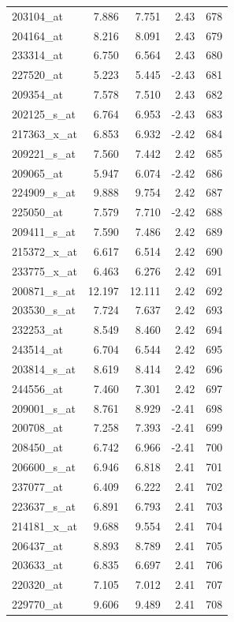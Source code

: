 \begin{footnotesize}
\begin{longtable}{lrrrr}
203104\_at & 7.886 & 7.751 & 2.43 & 678 \\
204164\_at & 8.216 & 8.091 & 2.43 & 679 \\
233314\_at & 6.750 & 6.564 & 2.43 & 680 \\
227520\_at & 5.223 & 5.445 & -2.43 & 681 \\
209354\_at & 7.578 & 7.510 & 2.43 & 682 \\
202125\_s\_at & 6.764 & 6.953 & -2.43 & 683 \\
217363\_x\_at & 6.853 & 6.932 & -2.42 & 684 \\
209221\_s\_at & 7.560 & 7.442 & 2.42 & 685 \\
209065\_at & 5.947 & 6.074 & -2.42 & 686 \\
224909\_s\_at & 9.888 & 9.754 & 2.42 & 687 \\
225050\_at & 7.579 & 7.710 & -2.42 & 688 \\
209411\_s\_at & 7.590 & 7.486 & 2.42 & 689 \\
215372\_x\_at & 6.617 & 6.514 & 2.42 & 690 \\
233775\_x\_at & 6.463 & 6.276 & 2.42 & 691 \\
200871\_s\_at & 12.197 & 12.111 & 2.42 & 692 \\
203530\_s\_at & 7.724 & 7.637 & 2.42 & 693 \\
232253\_at & 8.549 & 8.460 & 2.42 & 694 \\
243514\_at & 6.704 & 6.544 & 2.42 & 695 \\
203814\_s\_at & 8.619 & 8.414 & 2.42 & 696 \\
244556\_at & 7.460 & 7.301 & 2.42 & 697 \\
209001\_s\_at & 8.761 & 8.929 & -2.41 & 698 \\
200708\_at & 7.258 & 7.393 & -2.41 & 699 \\
208450\_at & 6.742 & 6.966 & -2.41 & 700 \\
206600\_s\_at & 6.946 & 6.818 & 2.41 & 701 \\
237077\_at & 6.409 & 6.222 & 2.41 & 702 \\
223637\_s\_at & 6.891 & 6.793 & 2.41 & 703 \\
214181\_x\_at & 9.688 & 9.554 & 2.41 & 704 \\
206437\_at & 8.893 & 8.789 & 2.41 & 705 \\
203633\_at & 6.835 & 6.697 & 2.41 & 706 \\
220320\_at & 7.105 & 7.012 & 2.41 & 707 \\
229770\_at & 9.606 & 9.489 & 2.41 & 708 \\

\end{longtable}
\end{footnotesize}
